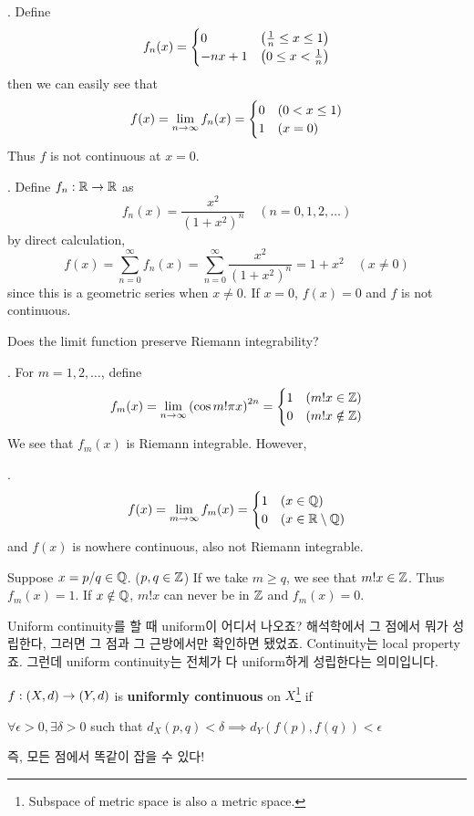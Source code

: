 \ex. Define
\[
    f_n(x) = \begin{cases}
        0       & \left( \frac{1}{n} \leq x \leq 1 \right) \\
        -nx + 1 & \left( 0 \leq x < \frac{1}{n} \right)
    \end{cases}
\]
then we can easily see that
\[
    f(x) = \lim_{n\rightarrow \infty} f_n(x) = \begin{cases}
        0 & (0 < x \leq 1) \\
        1 & (x = 0)
    \end{cases}
\]
Thus \(f\) is not continuous at \(x = 0\).

\ex. Define \(f_n: \mathbb{R} \rightarrow \mathbb{R}\) as
\[
    f_n(x) = \frac{x^2}{(1+x^2)^n} \quad (n = 0, 1, 2, \dots)
\]
by direct calculation,
\[
    f(x) = \sum_{n = 0}^\infty f_n(x) = \sum_{n = 0}^\infty \frac{x^2}{(1+x^2)^n} = 1 + x^2 \quad (x \neq 0)
\]
since this is a geometric series when \(x \neq 0\). If \(x = 0\), \(f(x) = 0\) and \(f\) is not continuous.

\question Does the limit function preserve Riemann integrability?

\ex. For \(m = 1, 2, \dots\), define
\[
    f_m(x) = \lim_{n\rightarrow \infty} \left(\cos m! \pi x\right)^{2n} = \begin{cases}
        1 & (m!x \in \mathbb{Z})    \\
        0 & (m!x \notin \mathbb{Z})
    \end{cases}
\]
We see that \(f_m(x)\) is Riemann integrable. However,

\quad \claim.
\[
    f(x) = \lim_{m\rightarrow \infty} f_m(x) = \begin{cases}
        1 & (x\in \mathbb{Q})         \\
        0 & (x \in \mathbb{R} \setminus \mathbb{Q})
    \end{cases}
\]
and \(f(x)\) is nowhere continuous, also not Riemann integrable.

\quad \pf Suppose \(x = p/q \in \mathbb{Q}\). (\(p, q\in \mathbb{Z}\)) If we take \(m \geq q\), we see that \(m! x \in \mathbb{Z}\). Thus \(f_m(x) = 1\). If \(x \notin \mathbb{Q}\), \(m! x\) can never be in \(\mathbb{Z}\) and \(f_m(x) = 0\).

\medskip

Uniform continuity를 할 때 uniform이 어디서 나오죠? 해석학에서 그 점에서 뭐가 성립한다, 그러면 그 점과 그 근방에서만 확인하면 됐었죠. Continuity는 local property죠. 그런데 uniform continuity는 전체가 다 uniform하게 성립한다는 의미입니다.

\recall \(f: (X, d) \rightarrow (Y, d)\) is \textbf{uniformly continuous} on \(X\)\footnote{Subspace of metric space is also a metric space.} if
\begin{center}
    \(\forall \epsilon > 0, \exists \delta > 0\) such that \(d_X(p, q) < \delta \implies d_Y(f(p), f(q)) < \epsilon\)
\end{center}
즉, 모든 점에서 똑같이 잡을 수 있다!


